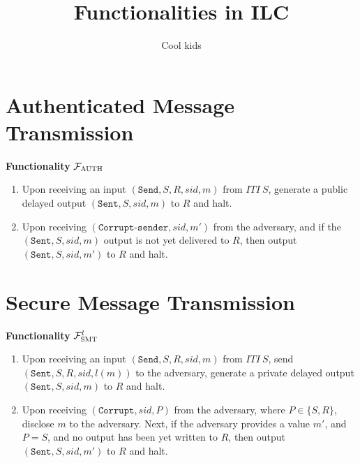 \documentclass[a4paper]{article}
\newcommand{\F}{\mathcal{F}}
\begin{document}
\title{Functionalities in ILC}
\author{Cool kids}
\date{}
\maketitle

\section{Authenticated Message Transmission}

\begin{framed}
    \centerline{\textbf{Functionality} $\F_{\textsc{AUTH}}$}
    \begin{enumerate}
        \item Upon receiving an input $(\texttt{Send}, S, R, sid, m)$ from $ITI\ S$, generate a public delayed output $(\texttt{Sent}, S, sid, m)$ to $R$ and halt.
        \item Upon receiving $(\texttt{Corrupt-sender}, sid, m')$ from the adversary, and if the $(\texttt{Sent}, S, sid, m)$ output is not yet delivered to $R$, then output $(\texttt{Sent}, S, sid, m')$ to $R$ and halt.
    \end{enumerate}
\end{framed}




\section{Secure Message Transmission}

\begin{framed}
    \centerline{\textbf{Functionality} $\F^l_{\textsc{SMT}}$}
    \begin{enumerate}
        \item Upon receiving an input $(\texttt{Send}, S, R, sid, m)$ from $ITI\ S$, send $(\texttt{Sent}, S, R, sid, l(m))$ to the adversary, generate a private delayed output $(\texttt{Sent}, S, sid, m)$ to $R$ and halt.
        \item Upon receiving $(\texttt{Corrupt}, sid, P)$ from the adversary, where $P \in \{S,R\}$, disclose $m$ to the adversary. Next, if the adversary provides a value $m'$, and $P = S$, and no output has been yet written to $R$, then output $(\texttt{Sent}, S, sid, m')$ to $R$ and halt.
    \end{enumerate}
\end{framed}


\end{document}
